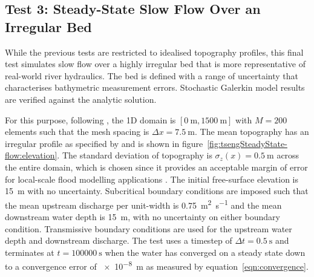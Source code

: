 \subsection{Test 3: Steady-State Slow Flow Over an Irregular Bed}
While the previous tests are restricted to idealised topography profiles, this final test simulates slow flow over a highly irregular bed that is more representative of real-world river hydraulics.
The bed is defined with a range of uncertainty that characterises bathymetric measurement errors.
Stochastic Galerkin model results are verified against the analytic solution.

For this purpose, following \citet{tseng2004}, the 1D domain is $[\SI{0}{\meter}, \SI{1500}{\meter}]$ with $M = 200$ elements such that the mesh spacing is $\Delta x = \SI{7.5}{\meter}$.
The mean topography has an irregular profile as specified by \citet{goutal-maurel1997} and is shown in figure~\ref{fig:tsengSteadyState-flow:elevation}.
The standard deviation of topography is $\sigma_z(x) = \SI{0.5}{\meter}$ across the entire domain, which is chosen since it provides an acceptable margin of error for local-scale flood modelling applications \citep{schumann-bates2018}.
The initial free-surface elevation is \SI{15}{\meter} with no uncertainty.
Subcritical boundary conditions are imposed such that the mean upstream discharge per unit-width is \SI{0.75}{\meter\squared\per\second} and the mean downstream water depth is \SI{15}{\meter}, with no uncertainty on either boundary condition.
Transmissive boundary conditions are used for the upstream water depth and downstream discharge.
The test uses a timestep of $\Delta t = \SI{0.5}{\second}$ and terminates at $t = \SI{100000}{\second}$ when the water has converged on a steady state down to a convergence error of \SI{e-8}{\meter} as measured by equation~\eqref{eqn:convergence}.

